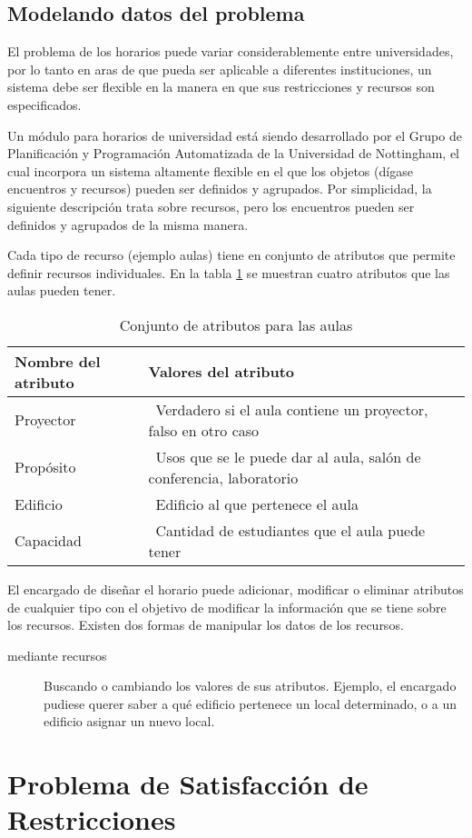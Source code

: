 \subsection{Modelando datos del problema}

El problema de los horarios puede variar considerablemente entre universidades, por lo tanto en aras de que pueda ser aplicable a diferentes instituciones, un sistema debe ser flexible en la manera en que sus restricciones y recursos son especificados.

Un módulo para horarios de universidad está siendo desarrollado por el Grupo de Planificación y Programación Automatizada de la Universidad de Nottingham, el cual incorpora un sistema altamente flexible en el que los objetos (dígase encuentros y recursos) pueden ser definidos y agrupados. Por simplicidad, la siguiente descripción trata sobre recursos, pero los encuentros pueden ser definidos y agrupados de la misma manera.

Cada tipo de recurso (ejemplo aulas) tiene en conjunto de atributos que permite definir recursos individuales. En la tabla \ref{table:atributes} se muestran cuatro atributos que las aulas pueden tener.

\begin{table}
	\caption{Conjunto de atributos para las aulas}
	\begin{center}
		\label{table:atributes}
		\begin{tabular}{lp{7.5cm}r}
			Nombre del atributo & Valores del atributo \\ \hline
			Proyector &\ Verdadero si el aula contiene un proyector, falso en otro caso \\
			Propósito &\ Usos que se le puede dar al aula, salón de conferencia, laboratorio \\
			Edificio &\ Edificio al que pertenece el aula \\
			Capacidad &\ Cantidad de estudiantes que el aula puede tener
		\end{tabular}
	\end{center}
\end{table}

El encargado de diseñar el horario puede adicionar, modificar o eliminar atributos de cualquier tipo con el objetivo de modificar la información que se tiene sobre los recursos. Existen dos formas de manipular los datos de los recursos.

\begin{description}
	\item[mediante recursos] Buscando o cambiando los valores de sus atributos. Ejemplo, el encargado pudiese querer saber a qu\'e edificio pertenece un local determinado, o a un edificio asignar un nuevo local.
\end{description}

\section{Problema de Satisfacción de Restricciones}
